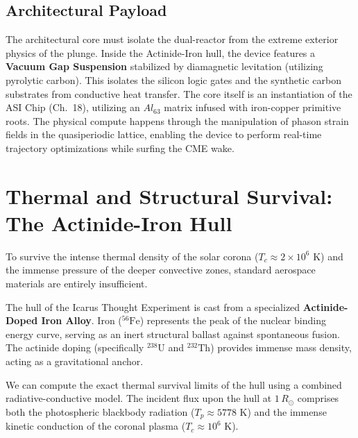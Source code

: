 \subsection{Architectural Payload}
The architectural core must isolate the dual-reactor from the extreme exterior physics of the plunge. Inside the Actinide-Iron hull, the device features a \textbf{Vacuum Gap Suspension} stabilized by diamagnetic levitation (utilizing pyrolytic carbon). This isolates the silicon logic gates and the synthetic carbon substrates from conductive heat transfer. The core itself is an instantiation of the ASI Chip (Ch.~18), utilizing an $Al_{63}$ matrix infused with iron-copper primitive roots. The physical compute happens through the manipulation of phason strain fields in the quasiperiodic lattice, enabling the device to perform real-time trajectory optimizations while surfing the CME wake.

\section[Thermal and Structural Survival]{Thermal and Structural Survival: The Actinide-Iron Hull}
To survive the intense thermal density of the solar corona ($T_c \approx 2 \times 10^6$ K) and the immense pressure of the deeper convective zones, standard aerospace materials are entirely insufficient. 

The hull of the Icarus Thought Experiment is cast from a specialized \textbf{Actinide-Doped Iron Alloy}. Iron ($^{56}\text{Fe}$) represents the peak of the nuclear binding energy curve, serving as an inert structural ballast against spontaneous fusion. The actinide doping (specifically $^{238}\text{U}$ and $^{232}\text{Th}$) provides immense mass density, acting as a gravitational anchor. 

We can compute the exact thermal survival limits of the hull using a combined radiative-conductive model. The incident flux upon the hull at $1\,R_{\odot}$ comprises both the photospheric blackbody radiation ($T_p \approx 5778$ K) and the immense kinetic conduction of the coronal plasma ($T_c \approx 10^6$ K). 

